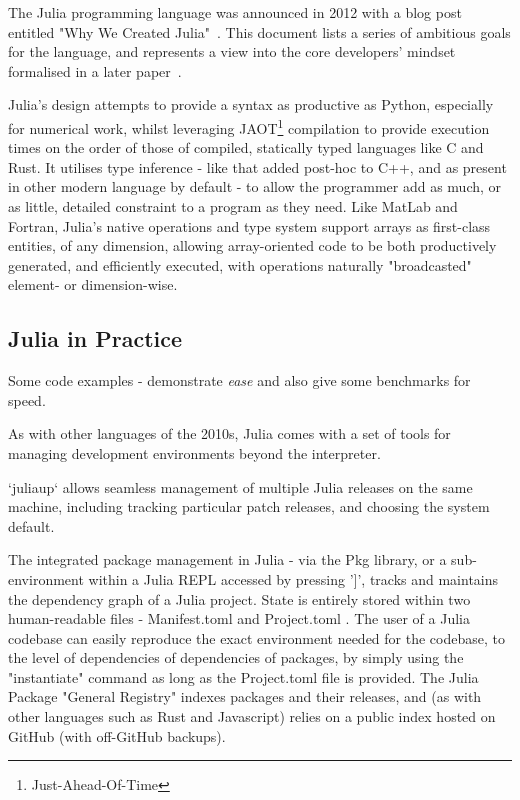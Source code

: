 \documentclass{webofc}
\begin{document}
The Julia programming language was announced in 2012 with a blog post entitled "Why We Created Julia"~\cite{bib:why-create-julia}.
This document lists a series of ambitious goals for the language, and represents a view into the core developers' mindset formalised in a later paper~\cite{bib:julia_freshapproach,10.1145/3276490}.

Julia's design attempts to provide a syntax as productive as Python, especially for numerical work, whilst leveraging JAOT\footnote{Just-Ahead-Of-Time} compilation to provide execution times
on the order of those of compiled, statically typed languages like C and Rust. It utilises type inference - like that added post-hoc to C++, and as present in other 
modern language by default - to allow the programmer add as much, or as little, detailed constraint to a program as they need. Like MatLab and Fortran,
Julia's native operations and type system support arrays as first-class entities, of any dimension, allowing array-oriented code to be both
productively generated, and efficiently executed, with operations naturally "broadcasted" element- or dimension-wise. 



\subsection{Julia in Practice}

Some code examples - demonstrate \emph{ease} and also give some benchmarks for
speed.





As with other languages of the 2010s, Julia comes with a set of tools for managing development environments beyond the interpreter.

`juliaup` allows seamless management of multiple Julia releases on the same machine, including tracking particular patch releases, and 
choosing the system default.

The integrated package management in Julia - via the Pkg library, or a sub-environment within a Julia REPL accessed by pressing '$]$', 
tracks and maintains the dependency graph of a Julia project. State is entirely stored within two human-readable files - Manifest.toml and Project.toml
. The user of a Julia codebase can easily reproduce the exact environment needed for the codebase, to the level of dependencies of 
dependencies of packages, by simply using the "instantiate" command as long as the Project.toml file is provided.
The Julia Package "General Registry" indexes packages and their releases, and (as with other languages such as Rust and Javascript) relies on a public
index hosted on GitHub (with off-GitHub backups).
\end{document}
